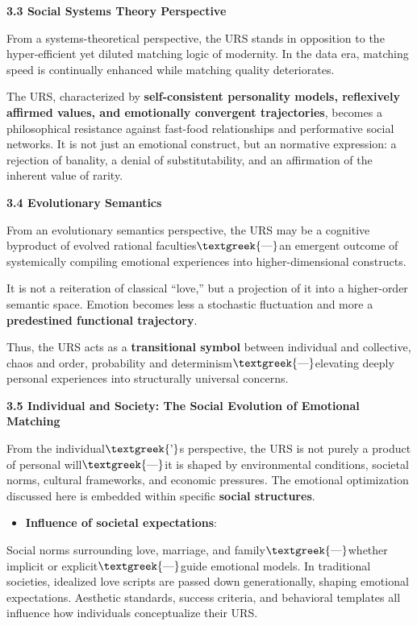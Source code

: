 \documentclass[a4paper]{article}
\begin{document}
\textbf{3.3 Social Systems Theory Perspective}

From a systems-theoretical perspective, the URS stands in opposition to the hyper-efficient yet diluted matching logic
of modernity. In the data era, matching speed is continually enhanced while matching quality deteriorates.

The URS, characterized by \textbf{self-consistent personality models, reflexively affirmed values, and emotionally
convergent trajectories}, becomes a philosophical resistance against fast-food relationships and performative social
networks. It is not just an emotional construct, but an normative expression: a rejection of banality, a denial of
substitutability, and an affirmation of the inherent value of rarity.

\textbf{3.4 Evolutionary Semantics}

From an evolutionary semantics perspective, the URS may be a cognitive byproduct of evolved rational
faculties$\text{\textgreek{—}}$an emergent outcome of systemically compiling emotional experiences into
higher-dimensional constructs.

It is not a reiteration of classical “love,” but a projection of it into a higher-order semantic space. Emotion becomes
less a stochastic fluctuation and more a \textbf{predestined functional trajectory}.

Thus, the URS acts as a \textbf{transitional symbol} between individual and collective, chaos and order, probability and
determinism$\text{\textgreek{—}}$elevating deeply personal experiences into structurally universal concerns.

\textbf{3.5 Individual and Society: The Social Evolution of Emotional Matching}

From the individual$\text{\textgreek{’}}$s perspective, the URS is not purely a product of personal
will$\text{\textgreek{—}}$it is shaped by environmental conditions, societal norms, cultural frameworks, and economic
pressures. The emotional optimization discussed here is embedded within specific \textbf{social structures}.

\begin{itemize}[series=listWWNumv,label=[F0B7?]]
\item \textbf{Influence of societal expectations}: 
\end{itemize}
Social norms surrounding love, marriage, and family$\text{\textgreek{—}}$whether implicit or
explicit$\text{\textgreek{—}}$guide emotional models. In traditional societies, idealized love scripts are passed down
generationally, shaping emotional expectations. Aesthetic standards, success criteria, and behavioral templates all
influence how individuals conceptualize their URS.
\end{document}
